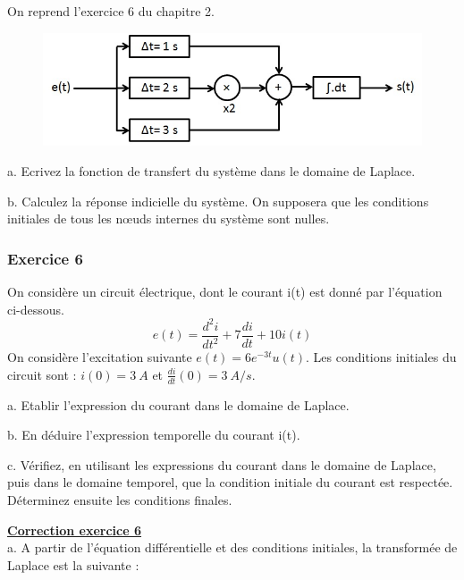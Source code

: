 \documentclass[11pt]{report}
\begin{document}
	On reprend l'exercice 6 du chapitre 2.
	
	
	\begin{figure}[h!]
		\centering
		\includegraphics[scale=0.5]{images/Exo_2_6.jpg} 
	\end{figure}
	
	a. Ecrivez la fonction de transfert du système dans le domaine de Laplace.
	
	b. Calculez la réponse indicielle du système. On supposera que les conditions initiales de tous les nœuds internes du système sont nulles. 
	
	
	\vspace{1\baselineskip}
	
	\subsubsection{Exercice 6}
	
	On considère un circuit électrique, dont le courant i(t) est donné par l'équation ci-dessous.
	\begin{equation*}
		e(t)=\frac{d^{2}i}{dt^{2}}+7\frac{di}{dt}+10i(t)
	\end{equation*}
	On considère l'excitation suivante $e(t)=6e^{-3t}u(t)$. Les conditions initiales du circuit sont : $i(0) = 3~A$ et $\frac{di}{dt}(0)=3~A/s$.
	
	
	a. Etablir l'expression du courant dans le domaine de Laplace.
	
	b. En déduire l'expression temporelle du courant i(t).
	
	c. Vérifiez, en utilisant les expressions du courant dans le domaine de Laplace, puis dans le domaine temporel, que la condition initiale du courant est respectée. Déterminez ensuite les conditions finales.
	
	\vspace{1\baselineskip}
	
	\textbf{\underline{Correction exercice 6}}\\
	a. A partir de l'équation différentielle et des conditions initiales, la transformée de Laplace est la suivante :
	
\end{document}
